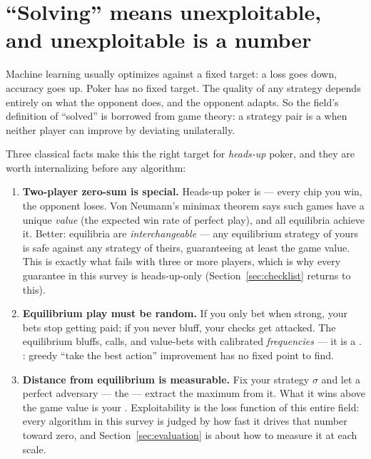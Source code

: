 \section{``Solving'' means unexploitable, and unexploitable is a number}\label{sec:solving}

Machine learning usually optimizes against a fixed target: a loss goes down, accuracy goes up. Poker has no fixed target. The quality of any strategy depends entirely on what the opponent does, and the opponent adapts. So the field's definition of ``solved'' is borrowed from game theory: a strategy pair is a  when neither player can improve by deviating unilaterally. 

Three classical facts make this the right target for \emph{heads-up} poker, and they are worth internalizing before any algorithm:

\begin{enumerate}
\item \textbf{Two-player zero-sum is special.} Heads-up poker is  --- every chip you win, the opponent loses. Von Neumann's minimax theorem says such games have a unique \emph{value} (the expected win rate of perfect play), and all equilibria achieve it. Better: equilibria are \emph{interchangeable} --- any equilibrium strategy of yours is safe against any strategy of theirs, guaranteeing at least the game value. This is exactly what fails with three or more players, which is why every guarantee in this survey is heads-up-only (Section~\ref{sec:checklist} returns to this).
\item \textbf{Equilibrium play must be random.} If you only bet when strong, your bets stop getting paid; if you never bluff, your checks get attacked. The equilibrium bluffs, calls, and value-bets with calibrated \emph{frequencies} --- it is a . : greedy ``take the best action'' improvement has no fixed point to find.
\item \textbf{Distance from equilibrium is measurable.} Fix your strategy $\sigma$ and let a perfect adversary --- the  --- extract the maximum from it. What it wins above the game value is your . Exploitability is the loss function of this entire field: every algorithm in this survey is judged by how fast it drives that number toward zero, and Section~\ref{sec:evaluation} is about how to measure it at each scale.
\end{enumerate}

